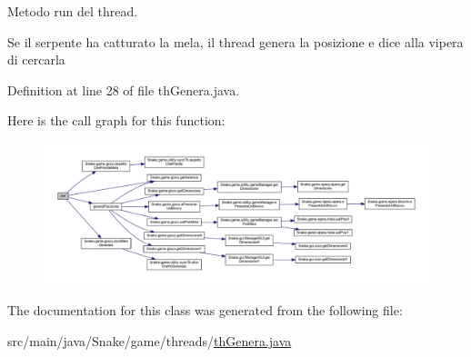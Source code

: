 Metodo run del thread. 

Se il serpente ha catturato la mela, il thread genera la posizione e dice alla vipera di cercarla 

Definition at line 28 of file th\+Genera.\+java.

Here is the call graph for this function\+:
\nopagebreak
\begin{figure}[H]
\begin{center}
\leavevmode
\includegraphics[width=350pt]{class_snake_1_1game_1_1threads_1_1th_genera_a13a43e6d814de94978c515cb084873b1_cgraph}
\end{center}
\end{figure}


The documentation for this class was generated from the following file\+:\begin{DoxyCompactItemize}
\item 
src/main/java/\+Snake/game/threads/\mbox{\hyperlink{th_genera_8java}{th\+Genera.\+java}}\end{DoxyCompactItemize}
